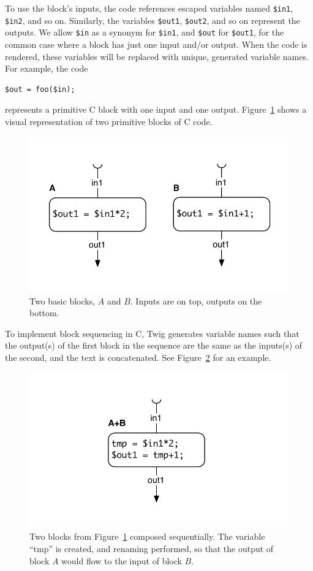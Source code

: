 To use the block's inputs, the code references escaped variables
named \texttt{\$in1}, \texttt{\$in2}, and so on. Similarly, the
variables \texttt{\$out1}, \texttt{\$out2}, and so on represent
the outputs. We allow \texttt{\$in} as a synonym for
\texttt{\$in1}, and \texttt{\$out} for \texttt{\$out1}, for the
common case where a block has just one input and/or output. When
the code is rendered, these variables will be replaced with
unique, generated variable names. For example, the code

\begin{verbatim}
$out = foo($in);
\end{verbatim}

represents a primitive C block with one input and one output.
Figure~\ref{fig:blocks} shows a visual representation of two
primitive blocks of C code.

\begin{figure}[ht]
\centering
\includegraphics[width=0.75\columnwidth]{images/code-gen1}
\caption{Two basic blocks, $A$ and $B$. Inputs are on top, outputs 
on the bottom.}
\label{fig:blocks}
\end{figure}

To implement block sequencing in C, Twig generates variable names
such that the output(s) of the first block in the sequence are the
same as the inputs(s) of the second, and the text is concatenated.
See Figure~\ref{fig:codegen-seq} for an example.

\begin{figure}[ht]
\centering
\includegraphics[width=0.75\columnwidth]{images/code-gen2}
\caption{Two blocks from Figure~\ref{fig:blocks} composed 
sequentially. The variable ``tmp'' is created, and renaming 
performed, so that the output of block $A$ would flow to the input 
of block $B$.}
\label{fig:codegen-seq}
\end{figure}

